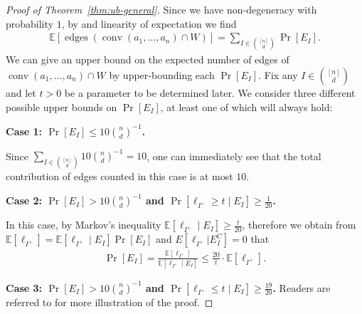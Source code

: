 \documentclass{article}\usepackage[a4paper,margin=20mm]{geometry}
\newcommand{\E}{\mathbb E}
\newcommand{\conv}{\operatorname{conv}}
\newcommand{\edges}{\operatorname{edges}}
\begin{document}
\begin{proof}[Proof of Theorem~\ref{thm:ub-general}]
    Since we have non-degeneracy with probability $1$, by  and linearity of expectation we find
    \begin{align*}
        \E\left[ \edges\left(\conv(a_1, \ldots, a_n) \cap W \right) \right] = \sum_{I \in \binom{[n]}{d}} \Pr[E_I].
    \end{align*}
    We can give an upper bound on the expected number of edges of $\conv(a_1, \ldots, a_n) \cap W$
    by upper-bounding each $\Pr[E_I]$.
    Fix any $I \in \binom{[n]}{d}$ and let $t > 0$ be a parameter to be determined later. 
    We consider three different possible upper bounds on $\Pr[E_I]$, at least one of which will always hold:
    
    {\bf Case 1: $\Pr[E_I] \leq 10\binom{n}{d}^{-1}$.} 
    
    Since $\sum_{I \in \binom{[n]}{d}}10 \binom{n}{d}^{-1} = 10$, one can immediately see that the total contribution of edges counted in this case is at most $10$.
    
    {\bf Case 2: $\Pr[E_I] > 10\binom{n}{d}^{-1}$ and $\Pr[\ell_{I^+} \geq t \mid E_I] \geq \frac{1}{20}$.} 
    
    In this case, by Markov's inequality $\E[\ell_{I^+} \mid E_I] \geq \frac{t}{20}$, therefore we obtain from $\mathbb{E}[\ell_{I^+}] = \mathbb{E}[\ell_{I^+}\mid E_I] \Pr[E_I]$ and $E[\ell_{I^{+}}| E_{I}^{C}] = 0$ that
    \begin{align*}
        \Pr[E_I] = \frac{\E[\ell_{I^+}]}{\E[\ell_{I^+} \mid E_I]} \leq \frac{20}{t} \cdot \E[\ell_{I^+}].
    \end{align*}
    
    {\bf Case 3: $\Pr[E_I] > 10 \binom{n}{d}^{-1}$ and $\Pr[\ell_{I^+} \leq t \mid E_I] \geq \frac{19}{20}$.}
    Readers are referred to  for more illustration of the proof.
    

\end{proof}
\end{document}
